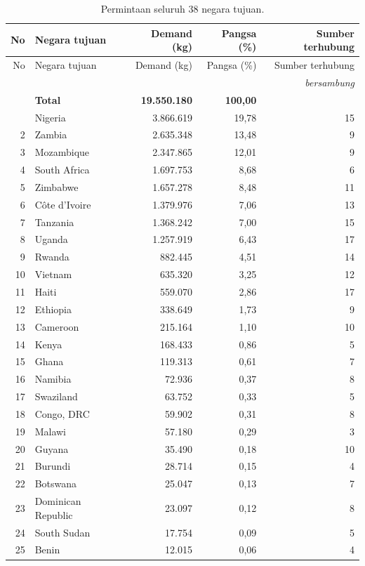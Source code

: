 \documentclass[a4paper,11pt]{article}
\begin{document}
{\small
\begin{longtable}{@{}r l r r r@{}}
\caption{Permintaan seluruh 38 negara tujuan.}\label{tab:demand}\\
\toprule
No & Negara tujuan & Demand (kg) & Pangsa (\%) & Sumber terhubung \\
\midrule
\endfirsthead
\toprule
No & Negara tujuan & Demand (kg) & Pangsa (\%) & Sumber terhubung \\
\midrule
\endhead
\midrule \multicolumn{5}{r}{\textit{bersambung}}\\
\endfoot
\midrule
 & \textbf{Total} & \textbf{19.550.180} & \textbf{100,00} & \\
\bottomrule
\endlastfoot
1 & Nigeria & 3.866.619 & 19,78 & 15 \\
2 & Zambia & 2.635.348 & 13,48 & 9 \\
3 & Mozambique & 2.347.865 & 12,01 & 9 \\
4 & South Africa & 1.697.753 & 8,68 & 6 \\
5 & Zimbabwe & 1.657.278 & 8,48 & 11 \\
6 & C\^ote d'Ivoire & 1.379.976 & 7,06 & 13 \\
7 & Tanzania & 1.368.242 & 7,00 & 15 \\
8 & Uganda & 1.257.919 & 6,43 & 17 \\
9 & Rwanda & 882.445 & 4,51 & 14 \\
10 & Vietnam & 635.320 & 3,25 & 12 \\
11 & Haiti & 559.070 & 2,86 & 17 \\
12 & Ethiopia & 338.649 & 1,73 & 9 \\
13 & Cameroon & 215.164 & 1,10 & 10 \\
14 & Kenya & 168.433 & 0,86 & 5 \\
15 & Ghana & 119.313 & 0,61 & 7 \\
16 & Namibia & 72.936 & 0,37 & 8 \\
17 & Swaziland & 63.752 & 0,33 & 5 \\
18 & Congo, DRC & 59.902 & 0,31 & 8 \\
19 & Malawi & 57.180 & 0,29 & 3 \\
20 & Guyana & 35.490 & 0,18 & 10 \\
21 & Burundi & 28.714 & 0,15 & 4 \\
22 & Botswana & 25.047 & 0,13 & 7 \\
23 & Dominican Republic & 23.097 & 0,12 & 8 \\
24 & South Sudan & 17.754 & 0,09 & 5 \\
25 & Benin & 12.015 & 0,06 & 4 \\

\end{longtable}}
\end{document}
